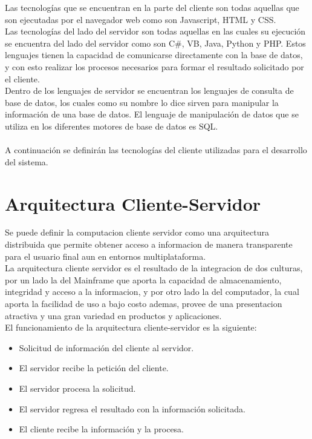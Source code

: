 Las tecnolog\'ias que se encuentran en la parte del cliente son todas aquellas que son ejecutadas por el navegador web como son Javascript, HTML y CSS.\\

Las tecnolog\'ias del lado del servidor son todas aquellas en las cuales su ejecuci\'on se encuentra del lado del servidor como son C\#, VB, Java, Python y PHP. Estos lenguajes tienen la capacidad de comunicarse directamente con la base de datos, y con esto realizar los procesos necesarios para formar el resultado solicitado por el cliente.\\ 	

Dentro de los lenguajes de servidor se encuentran los lenguajes de consulta de base de datos, los cuales como su nombre lo dice sirven para manipular la informaci\'on de una base de datos. El lenguaje de manipulaci\'on de datos que se utiliza en los diferentes motores de base de datos es SQL.\\ \\
A continuaci\'on se definir\'an las tecnolog\'ias del cliente utilizadas para el desarrollo del sistema.
\section{Arquitectura Cliente-Servidor}

Se puede definir la computacion cliente servidor  como una arquitectura  distribuida que permite obtener acceso a informacion de manera transparente para el usuario final aun en entornos multiplataforma.\\

La arquitectura cliente servidor es el resultado de la integracion de dos culturas, por un lado la del Mainframe que aporta la capacidad de almacenamiento, integridad y acceso a la informacion, y por otro lado la del computador, la cual aporta la facilidad de uso a bajo costo ademas, provee de una presentacion atractiva y una gran variedad en productos y aplicaciones.\\

El funcionamiento de la arquitectura cliente-servidor es la siguiente:

\begin{itemize}
	\item Solicitud de informaci\'on del cliente al servidor.
	\item El servidor recibe la petici\'on del cliente.
	\item El servidor procesa la solicitud.
	\item El servidor regresa el resultado con la informaci\'on solicitada.
	\item El cliente recibe la informaci\'on y la procesa.
\end{itemize}

